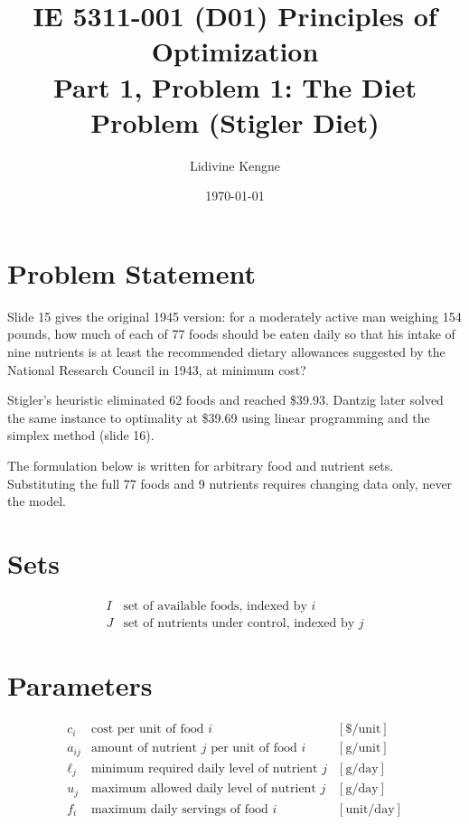 \documentclass[11pt]{article}
\title{IE 5311-001 (D01) Principles of Optimization\\[2pt]
       \large Part 1, Problem 1: The Diet Problem (Stigler Diet)}
\author{Lidivine Kengne}
\date{\today}
\theoremstyle{definition}
\begin{document}
\maketitle

\section{Problem Statement}

Slide 15 gives the original 1945 version: for a moderately active man
weighing 154 pounds, how much of each of 77 foods should be eaten daily
so that his intake of nine nutrients is at least the recommended dietary
allowances suggested by the National Research Council in 1943, at
minimum cost?

Stigler's heuristic eliminated 62 foods and reached \$39.93. Dantzig
later solved the same instance to optimality at \$39.69 using linear
programming and the simplex method (slide 16).

The formulation below is written for arbitrary food and nutrient sets.
Substituting the full 77 foods and 9 nutrients requires changing data
only, never the model.

\section{Sets}

\[
\begin{array}{ll}
  I & \text{set of available foods, indexed by } i \\[2pt]
  J & \text{set of nutrients under control, indexed by } j
\end{array}
\]

\section{Parameters}

\[
\begin{array}{lll}
  c_i    & \text{cost per unit of food } i                    & [\text{\$}/\text{unit}] \\[2pt]
  a_{ij} & \text{amount of nutrient } j \text{ per unit of food } i & [\text{g}/\text{unit}] \\[2pt]
  \ell_j & \text{minimum required daily level of nutrient } j  & [\text{g}/\text{day}] \\[2pt]
  u_j    & \text{maximum allowed daily level of nutrient } j   & [\text{g}/\text{day}] \\[2pt]
  f_i    & \text{maximum daily servings of food } i            & [\text{unit}/\text{day}]
\end{array}
\]
\end{document}
